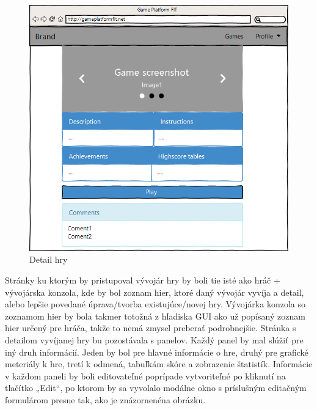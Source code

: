 \begin{figure}[h]
  \centering
  \includegraphics[scale=0.6]{fig/gui-detail-hry.png}
  \caption{Detail hry}
  \label{fig:guidetailrhy}
\end{figure}
Stránky ku ktorým by pristupoval vývojár hry by boli tie isté ako hráč + vývojárska konzola, kde by bol zoznam hier, ktoré daný vývojár vyvíja a detail, alebo lepšie povedané úprava/tvorba existujúce/novej hry. Vývojárka konzola so zoznamom hier by bola takmer totožná z hľadiska GUI ako  už popísaný zoznam hier určený pre hráča, takže to nemá zmysel preberať podrobnejšie. Stránka s detailom vyvíjanej hry bu pozostávala s panelov. Každý panel by mal slúžiť pre iný druh informácií. Jeden by bol pre hlavné informácie o hre, druhý pre grafické meteriály k hre, tretí k odmená, tabuľkám skóre a zobrazenie štatistík. Informácie v každom paneli by boli editovateľné poprípade vytvoriteľné po kliknutí na tlačítko „Edit“, po ktorom by sa vyvolalo modálne okno s príslušným editačným formulárom presne tak, ako je znázornenéna obrázku.
